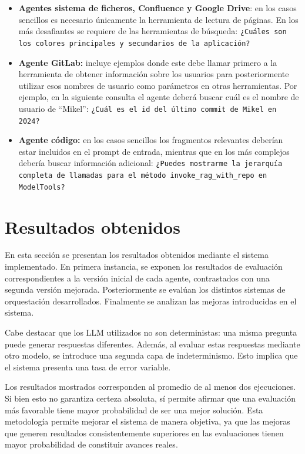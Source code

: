\begin{itemize}
\begin{itemize}
\end{itemize}
\item\textbf{Agentes sistema de ficheros, Confluence y Google Drive}: en los casos sencillos es necesario únicamente la herramienta de lectura de páginas. En los más desafiantes se requiere de las herramientas de búsqueda: \texttt{¿Cuáles son los colores principales y secundarios de la aplicación?}
\item\textbf{Agente GitLab: }incluye ejemplos donde este debe llamar primero a la herramienta de obtener información sobre los usuarios para posteriormente utilizar esos nombres de usuario como parámetros en otras herramientas. Por ejemplo, en la siguiente consulta el agente deberá buscar cuál es el nombre de usuario de ``Mikel'': \texttt{¿Cuál es el id del último commit de Mikel en 2024?}
\item\textbf{Agente código: }en los casos sencillos los fragmentos relevantes deberían estar incluidos en el prompt de entrada, mientras que en los más complejos debería buscar información adicional: \texttt{¿Puedes mostrarme la jerarquía completa de llamadas para el método invoke\_rag\_with\_repo en ModelTools?}
\end{itemize}

\section{Resultados obtenidos}
En esta sección se presentan los resultados obtenidos mediante el sistema implementado. En primera instancia, se exponen los resultados de evaluación correspondientes a la versión inicial de cada agente, contrastados con una segunda versión mejorada. Posteriormente se evalúan los distintos sistemas de orquestación desarrollados. Finalmente se analizan las mejoras introducidas en el sistema.

Cabe destacar que los LLM utilizados no son deterministas: una misma pregunta puede generar respuestas diferentes. Además, al evaluar estas respuestas mediante otro modelo, se introduce una segunda capa de indeterminismo. Esto implica que el sistema presenta una tasa de error variable.

Los resultados mostrados corresponden al promedio de al menos dos ejecuciones. Si bien esto no garantiza certeza absoluta, sí permite afirmar que una evaluación más favorable tiene mayor probabilidad de ser una mejor solución. Esta metodología permite mejorar el sistema de manera objetiva, ya que las mejoras que generen resultados consistentemente superiores en las evaluaciones tienen mayor probabilidad de constituir avances reales.

